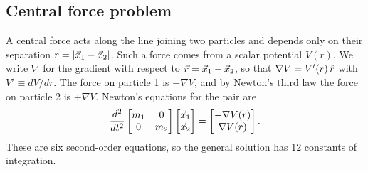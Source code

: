 \subsection{Central force problem}
	A central force acts along the line joining two particles and depends only on their separation $r=|\vec x_1-\vec x_2|$. Such a force comes from a scalar potential $V(r)$. We write $\nabla$ for the gradient with respect to $\vec r=\vec x_1-\vec x_2$, so that $\nabla V=V'(r)\,\hat r$ with $V'\equiv dV/dr$. The force on particle 1 is $-\nabla V$, and by Newton's third law the force on particle 2 is $+\nabla V$. Newton's equations for the pair are
	\begin{equation}
		\frac{d^2}{dt^2}\begin{bmatrix}m_1 & 0\\0&m_2\end{bmatrix}\begin{bmatrix}\vec x_1\\\vec x_2\end{bmatrix}
		=\begin{bmatrix}-\nabla V(r)\\ \nabla V(r)\end{bmatrix}. \label{eq:eom2}
	\end{equation}
	These are six second-order equations, so the general solution has 12 constants of integration.

